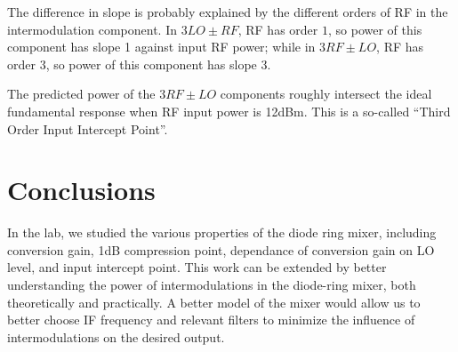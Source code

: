 \documentclass{article}
\begin{document}
The difference in slope is probably explained by the different orders of RF in the intermodulation component.
In $3LO \pm RF$, RF has order $1$, so power of this component has slope 1 against input RF power;
while in $3RF \pm LO$, RF has order $3$, so power of this component has slope 3.

The predicted power of the $3RF \pm LO$ components roughly intersect the ideal fundamental response when RF input power is 12dBm.
This is a so-called ``Third Order Input Intercept Point''.

\section{Conclusions}
In the lab, we studied the various properties of the diode ring mixer, including conversion gain, 1dB compression point, dependance of conversion gain on LO level, and input intercept point.
This work can be extended by better understanding the power of intermodulations in the diode-ring mixer, both theoretically and practically.
A better model of the mixer would allow us to better choose IF frequency and relevant filters to minimize the influence of intermodulations on the desired output.
\end{document}
